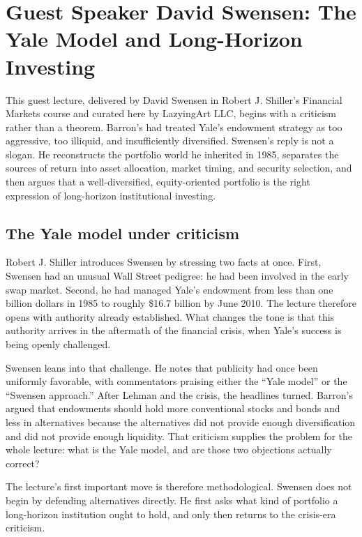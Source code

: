 \chapter{Guest Speaker David Swensen: The Yale Model and Long-Horizon Investing}

This guest lecture, delivered by David Swensen in Robert J. Shiller's Financial Markets course and curated here by LazyingArt LLC, begins with a criticism rather than a theorem. Barron's had treated Yale's endowment strategy as too aggressive, too illiquid, and insufficiently diversified. Swensen's reply is not a slogan. He reconstructs the portfolio world he inherited in 1985, separates the sources of return into asset allocation, market timing, and security selection, and then argues that a well-diversified, equity-oriented portfolio is the right expression of long-horizon institutional investing.

\section{The Yale model under criticism}

Robert J. Shiller introduces Swensen by stressing two facts at once. First, Swensen had an unusual Wall Street pedigree: he had been involved in the early swap market. Second, he had managed Yale's endowment from less than one billion dollars in 1985 to roughly \$16.7 billion by June 2010. The lecture therefore opens with authority already established. What changes the tone is that this authority arrives in the aftermath of the financial crisis, when Yale's success is being openly challenged.

Swensen leans into that challenge. He notes that publicity had once been uniformly favorable, with commentators praising either the ``Yale model'' or the ``Swensen approach.'' After Lehman and the crisis, the headlines turned. Barron's argued that endowments should hold more conventional stocks and bonds and less in alternatives because the alternatives did not provide enough diversification and did not provide enough liquidity. That criticism supplies the problem for the whole lecture: what is the Yale model, and are those two objections actually correct?

The lecture's first important move is therefore methodological. Swensen does not begin by defending alternatives directly. He first asks what kind of portfolio a long-horizon institution ought to hold, and only then returns to the crisis-era criticism.

